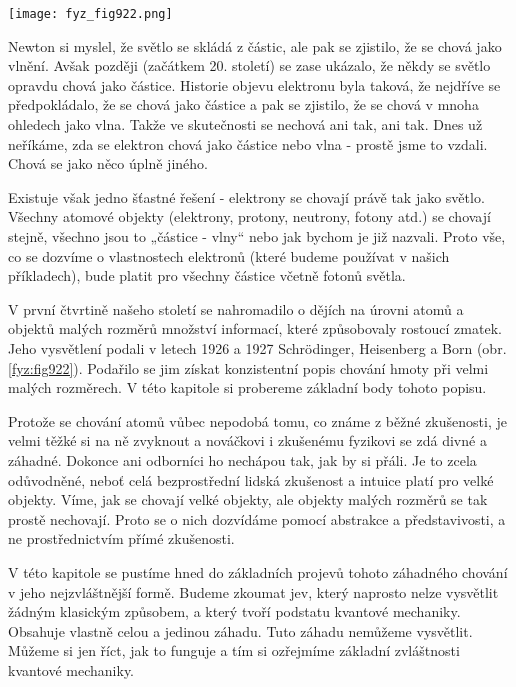     \begin{figure*}[ht!] %
      \centering
      \texttt{[image: fyz\_fig922.png]}
      \caption{Zleva: \MaxBorn \ErwinSchrodinger \WernerHeisenberg}
      \label{fyz:fig922}
    \end{figure*}

    Newton si myslel, že světlo se skládá z částic, ale pak se zjistilo, že se chová jako vlnění.
    Avšak později (začátkem 20. století) se zase ukázalo, že někdy se světlo opravdu chová jako
    částice. Historie objevu elektronu byla taková, že nejdříve se předpokládalo, že se chová jako
    částice a pak se zjistilo, že se chová v mnoha ohledech jako vlna. Takže ve skutečnosti se nechová
    ani tak, ani tak. Dnes už neříkáme, zda se elektron chová jako částice nebo vlna - prostě jsme to
    vzdali. Chová se jako něco úplně jiného.
    
    Existuje však jedno šťastné řešení - elektrony se chovají právě tak jako světlo. Všechny atomové
    objekty (elektrony, protony, neutrony, fotony atd.) se chovají stejně, všechno jsou to „částice -
    vlny“ nebo jak bychom je již nazvali. Proto vše, co se dozvíme o vlastnostech elektronů (které
    budeme používat v našich příkladech), bude platit pro všechny částice včetně fotonů světla.
    
    V první čtvrtině našeho století se nahromadilo o dějích na úrovni atomů a objektů malých rozměrů
    množství informací, které způsobovaly rostoucí zmatek. Jeho vysvětlení podali v letech 1926 a 1927
    Schrödinger, Heisenberg a Born (obr. \ref{fyz:fig922}). Podařilo se jim získat konzistentní popis
    chování hmoty při velmi malých rozměrech. V této kapitole si probereme základní body tohoto
    popisu.

    Protože se chování atomů vůbec nepodobá tomu, co známe z běžné zkušenosti, je velmi těžké si na ně
    zvyknout a nováčkovi i zkušenému fyzikovi se zdá divné a záhadné. Dokonce ani odborníci ho
    nechápou tak, jak by si přáli. Je to zcela odůvodněné, neboť celá bezprostřední lidská zkušenost a
    intuice platí pro velké objekty. Víme, jak se chovají velké objekty, ale objekty malých rozměrů se
    tak prostě nechovají. Proto se o nich dozvídáme pomocí abstrakce a představivosti, a ne
    prostřednictvím přímé zkušenosti.
    
    V této kapitole se pustíme hned do základních projevů tohoto záhadného chování v jeho
    nejzvláštnější formě. Budeme zkoumat jev, který naprosto nelze vysvětlit žádným klasickým
    způsobem, a který tvoří podstatu kvantové mechaniky. Obsahuje vlastně celou a jedinou záhadu. Tuto
    záhadu nemůžeme vysvětlit. Můžeme si jen říct, jak to funguje a tím si ozřejmíme základní
    zvláštnosti kvantové mechaniky.


